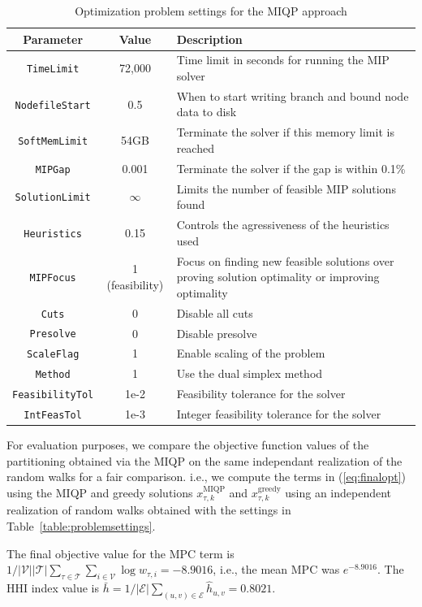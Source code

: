\documentclass[preprint,times]{elsarticle}
\begin{document}
\begin{table}[H]
\centering
\caption{Optimization problem settings for the \ac{MIQP} approach}
\begin{tabular}{|c|c|L{8cm}|}
\hline
\textbf{Parameter} & \textbf{Value} & \textbf{Description}\\
\hline
\texttt{TimeLimit} & 72,000 & Time limit in seconds for running the MIP solver\\
\texttt{NodefileStart} & 0.5 & When to start writing branch and bound node data to disk\\
\texttt{SoftMemLimit} & 54GB & Terminate the solver if this memory limit is reached \\
\texttt{MIPGap} & 0.001 & Terminate the solver if the gap is within 0.1\% \\
\texttt{SolutionLimit} & $\infty$ & Limits the number of feasible \ac{MIP} solutions found\\
\texttt{Heuristics} & 0.15 & Controls the agressiveness of the heuristics used\\
\texttt{MIPFocus} & 1 (feasibility) & Focus on finding new feasible solutions over proving solution optimality or improving optimality\\
\texttt{Cuts} & 0 & Disable all cuts\\
\texttt{Presolve} & 0 & Disable presolve\\
\texttt{ScaleFlag} & 1 & Enable scaling of the problem\\
\texttt{Method} & 1 & Use the dual simplex method\\
\texttt{FeasibilityTol} & 1e-2 & Feasibility tolerance for the solver\\
\texttt{IntFeasTol} & 1e-3 & Integer feasibility tolerance for the solver\\
\hline
\end{tabular}
\label{table:exactsolversettings}
\end{table}

For evaluation purposes, we compare the objective function values of the partitioning obtained via the \ac{MIQP} on the same independant realization of the random walks for a fair comparison. i.e., we compute the terms in (\ref{eq:finalopt}) using the MIQP and greedy solutions $x_{\tau,k}^\text{MIQP}$ and $x_{\tau,k}^\text{greedy}$ using an independent realization of random walks obtained with the settings in Table~\ref{table:problemsettings}.

The final objective value for the \ac{MPC} term is $1/{\lvert\mathcal{V}\rvert\lvert\mathcal{T}\rvert}\sum_{\tau\in\mathcal{T}}\sum_{i\in\mathcal{V}}\log{\hat{w}_{\tau,i}} = -8.9016$, i.e., the mean \ac{MPC} was $e^{-8.9016}$. The \ac{HHI} index value is $\bar{h} = 1/{\lvert\mathcal{E}\rvert}\sum_{(u,v)\in\mathcal{E}}\hat{h}_{u,v} = 0.8021$. 
\end{document}
